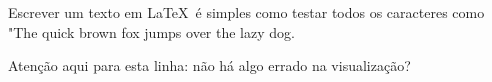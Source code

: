 \documentclass{article}
\begin{document}
	Escrever um texto em LaTeX~é simples como testar todos os caracteres como "The quick brown fox jumps over the lazy dog.

	Atenção aqui para esta linha: não há algo errado na visualização?	
\end{document}

